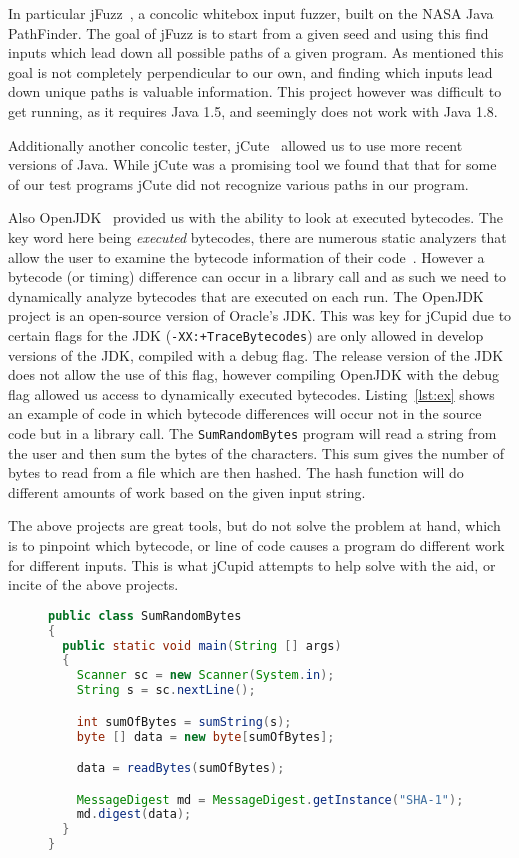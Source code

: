 \documentclass[letterpaper,twocolumn,10pt]{article}
\begin{document}
In particular jFuzz~\cite{jayaraman2009jfuzz}, a concolic whitebox input fuzzer, built on the NASA Java PathFinder. The goal of jFuzz is to start from a given seed and using this find inputs which lead down all possible paths of a given program. As mentioned this goal is not completely perpendicular to our own, and finding which inputs lead down unique paths is valuable information. This project however was difficult to get running, as it requires Java 1.5, and seemingly does not work with Java 1.8.

Additionally another concolic tester, jCute~\cite{conf/cav/SenA06} allowed us to use more recent versions of Java. While jCute was a promising tool we found that that for some of our test programs jCute did not recognize various paths in our program.

Also OpenJDK~\cite{OpenJDK} provided us with the ability to look at executed bytecodes. The key word here being \emph{executed} bytecodes, there are numerous static analyzers that allow the user to examine the bytecode information of their code~\cite{vallee1999soot}. However a bytecode (or timing) difference can occur in a library call and as such we need to dynamically analyze bytecodes that are executed on each run. The OpenJDK project is an open-source version of Oracle's JDK. This was key for jCupid due to certain flags for the JDK (\texttt{-XX:+TraceBytecodes}) are only allowed in develop versions of the JDK, compiled with a debug flag. The release version of the JDK does not allow the use of this flag, however compiling OpenJDK with the debug flag allowed us access to dynamically executed bytecodes. Listing~\ref{lst:ex} shows an example of code in which bytecode differences will occur not in the source code but in a library call. The \texttt{SumRandomBytes} program will read a string from the user and then sum the bytes of the characters. This sum gives the number of bytes to read from a file which are then hashed. The hash function will do different amounts of work based on the given input string.

The above projects are great tools, but do not solve the problem at hand, which is to pinpoint which bytecode, or line of code causes a program do different work for different inputs. This is what jCupid attempts to help solve with the aid, or incite of the above projects.

\begin{figure}[t]
  \begin{center}
    \begin{lstlisting}[caption={Example of code with bytecode difference in library call},label={lst:ex},language=Java]
public class SumRandomBytes
{
  public static void main(String [] args)
  {
    Scanner sc = new Scanner(System.in);
    String s = sc.nextLine();

    int sumOfBytes = sumString(s);
    byte [] data = new byte[sumOfBytes];

    data = readBytes(sumOfBytes);

    MessageDigest md = MessageDigest.getInstance("SHA-1");
    md.digest(data);
  }
}
    \end{lstlisting}
  \end{center}
\end{figure}
\end{document}
